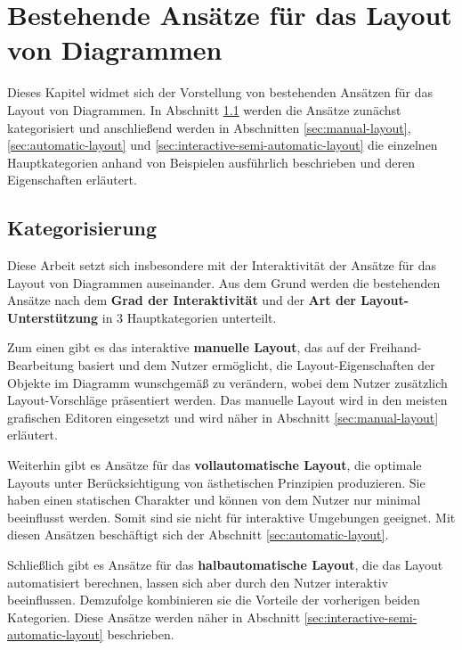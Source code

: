 
\chapter{Bestehende Ansätze für das Layout von Diagrammen}
\label{chapter:existing-approaches}

Dieses Kapitel widmet sich der Vorstellung von bestehenden Ansätzen für das Layout von Diagrammen. In Abschnitt \ref{sec:categorization} werden die Ansätze zunächst kategorisiert und anschließend werden in Abschnitten \ref{sec:manual-layout}, \ref{sec:automatic-layout} und \ref{sec:interactive-semi-automatic-layout} die einzelnen Hauptkategorien anhand von Beispielen ausführlich beschrieben und deren Eigenschaften erläutert.

\section{Kategorisierung}
\label{sec:categorization}

Diese Arbeit setzt sich insbesondere mit der Interaktivität der Ansätze für das Layout von Diagrammen auseinander. Aus dem Grund werden die bestehenden Ansätze nach dem \textbf{Grad der Interaktivität} und der \textbf{Art der Layout-Unterstützung} in 3 Hauptkategorien unterteilt.

Zum einen gibt es das interaktive \textbf{manuelle Layout}, das auf der Freihand-Bearbeitung basiert und dem Nutzer ermöglicht, die Layout-Eigenschaften der Objekte im Diagramm wunschgemäß zu verändern, wobei dem Nutzer zusätzlich Layout-Vorschläge präsentiert werden. Das manuelle Layout wird in den meisten grafischen Editoren eingesetzt und wird näher in Abschnitt \ref{sec:manual-layout} erläutert.

Weiterhin gibt es Ansätze für das \textbf{vollautomatische Layout}, die optimale Layouts unter Berücksichtigung von ästhetischen Prinzipien produzieren. Sie haben einen statischen Charakter und können von dem Nutzer nur minimal beeinflusst werden. Somit sind sie nicht für interaktive Umgebungen geeignet. Mit diesen Ansätzen beschäftigt sich der Abschnitt \ref{sec:automatic-layout}.

Schließlich gibt es Ansätze für das \textbf{halbautomatische Layout}, die das Layout automatisiert berechnen, lassen sich aber durch den Nutzer interaktiv beeinflussen. Demzufolge kombinieren sie die Vorteile der vorherigen beiden Kategorien. Diese Ansätze werden näher in Abschnitt \ref{sec:interactive-semi-automatic-layout} beschrieben.

